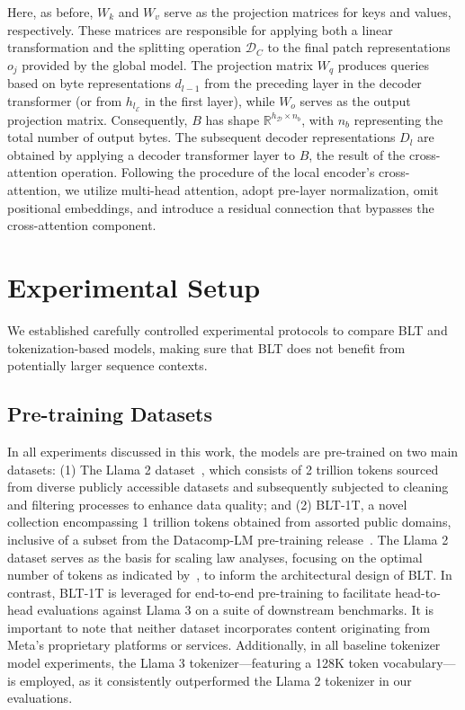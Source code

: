Here, as before, $W_k$ and $W_v$ serve as the projection matrices for keys and values, respectively. These matrices are responsible for applying both a linear transformation and the splitting operation $\mathcal{D}_C$ to the final patch representations $o_j$ provided by the global model. The projection matrix $W_q$ produces queries based on byte representations $d_{l-1}$ from the preceding layer in the decoder transformer (or from $h_{l_{\mathcal{E}}}$ in the first layer), while $W_o$ serves as the output projection matrix. Consequently, $B$ has shape $\mathbb{R}^{h_{\mathcal{D}} \times n_b}$, with $n_b$ representing the total number of output bytes. The subsequent decoder representations $D_l$ are obtained by applying a decoder transformer layer to $B$, the result of the cross-attention operation. Following the procedure of the local encoder’s cross-attention, we utilize multi-head attention, adopt pre-layer normalization, omit positional embeddings, and introduce a residual connection that bypasses the cross-attention component.

\section{Experimental Setup}
\label{section:experiments}
We established carefully controlled experimental protocols to compare {\textsc BLT} and tokenization-based models, making sure that {\textsc BLT} does not benefit from potentially larger sequence contexts.

\subsection{Pre-training Datasets} In all experiments discussed in this work, the models are pre-trained on two main datasets: (1) The Llama 2 dataset~\citep{touvron2023llama}, which consists of 2 trillion tokens sourced from diverse publicly accessible datasets and subsequently subjected to cleaning and filtering processes to enhance data quality; and (2) {\textsc BLT}-1T, a novel collection encompassing 1 trillion tokens obtained from assorted public domains, inclusive of a subset from the Datacomp-LM pre-training release~\citep{li2024datacomp}. The Llama 2 dataset serves as the basis for scaling law analyses, focusing on the optimal number of tokens as indicated by~\cite{dubey2024llama}, to inform the architectural design of {\textsc BLT}. In contrast, {\textsc BLT}-1T is leveraged for end-to-end pre-training to facilitate head-to-head evaluations against Llama 3 on a suite of downstream benchmarks. It is important to note that neither dataset incorporates content originating from Meta’s proprietary platforms or services. Additionally, in all baseline tokenizer model experiments, the Llama 3 tokenizer—featuring a 128K token vocabulary—is employed, as it consistently outperformed the Llama 2 tokenizer in our evaluations.

